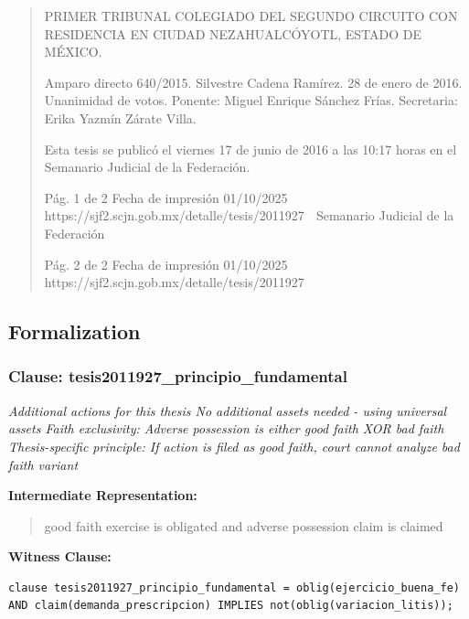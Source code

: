 \documentclass[11pt,a4paper]{article}
\begin{document}
\begin{quote}
PRIMER TRIBUNAL COLEGIADO DEL SEGUNDO CIRCUITO CON RESIDENCIA EN CIUDAD
NEZAHUALCÓYOTL, ESTADO DE MÉXICO.


Amparo directo 640/2015. Silvestre Cadena Ramírez. 28 de enero de 2016. Unanimidad de votos.
Ponente: Miguel Enrique Sánchez Frías. Secretaria: Erika Yazmín Zárate Villa.


Esta tesis se publicó el viernes 17 de junio de 2016 a las 10:17 horas en el Semanario Judicial de la
Federación.




                                              Pág. 1 de 2             Fecha de impresión 01/10/2025
  https://sjf2.scjn.gob.mx/detalle/tesis/2011927
                                                 Semanario Judicial de la Federación




                                            Pág. 2 de 2       Fecha de impresión 01/10/2025
https://sjf2.scjn.gob.mx/detalle/tesis/2011927

\end{quote}

\subsection{Formalization}

\subsubsection{Clause: tesis2011927\_principio\_fundamental}

\textit{Additional actions for this thesis No additional assets needed - using universal assets Faith exclusivity: Adverse possession is either good faith XOR bad faith Thesis-specific principle: If action is filed as good faith, court cannot analyze bad faith variant}

\textbf{Intermediate Representation:}

\begin{quote}
good faith exercise is obligated and adverse possession claim is claimed
\end{quote}

\textbf{Witness Clause:}

\begin{lstlisting}[style=witnessstyle, language=Witness]
clause tesis2011927_principio_fundamental = oblig(ejercicio_buena_fe) AND claim(demanda_prescripcion) IMPLIES not(oblig(variacion_litis));
\end{lstlisting}
\end{document}
